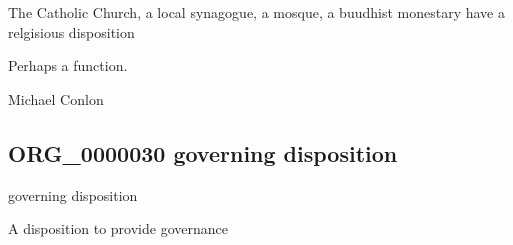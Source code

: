 \documentclass[letterpaper,10pt,english]{sphinxmanual}
\begin{document}
\begin{sphinxShadowBox}

\sphinxAtStartPar
The Catholic Church, a local synagogue, a mosque, a buudhist monestary have a relgisious disposition
\end{sphinxShadowBox}

\begin{sphinxShadowBox}

\sphinxAtStartPar
Perhaps a function.
\end{sphinxShadowBox}

\begin{sphinxShadowBox}

\sphinxAtStartPar
Michael Conlon 
\end{sphinxShadowBox}
\begin{quote}

\ignorespaces \end{quote}


\subsection{ORG\_0000030 \sphinxhyphen{} governing disposition}
\label{\detokenize{doc-ORG_0000030:org-0000030-governing-disposition}}\label{\detokenize{doc-ORG_0000030:index-0}}\label{\detokenize{doc-ORG_0000030::doc}}
\begin{sphinxShadowBox}

\sphinxAtStartPar
governing disposition
\end{sphinxShadowBox}

\begin{sphinxShadowBox}

\sphinxAtStartPar
{\hyperref[\detokenize{doc-BFO_0000016::doc}]{}}
\end{sphinxShadowBox}

\begin{sphinxShadowBox}

\sphinxAtStartPar
A disposition to provide governance
\end{sphinxShadowBox}
\end{document}
